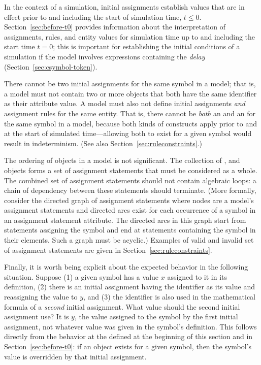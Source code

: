 In the context of a simulation, initial assignments establish
values that are in effect prior to and including the start of
simulation time, \ie $t \leq 0$.  Section~\ref{sec:before-t0}
provides information about the interpretation of assignments,
rules, and entity values for simulation time up to and including
the start time $t = 0$; this is important for establishing the
initial conditions of a simulation if the model involves
expressions containing the \emph{delay} 
(Section~\ref{sec:csymbol-token}).

There cannot be two initial assignments for the same symbol in a
model; that is, a model must not contain two or more
\InitialAssignment objects that both have the same identifier as
their  attribute value.  A model must also not define
initial assignments \emph{and} assignment rules for the same
entity.  That is, there cannot be \emph{both} an
\InitialAssignment and an \AssignmentRule for the same symbol in a
model, because both kinds of constructs apply prior to and at the
start of simulated time---allowing both to exist for a given
symbol would result in indeterminism.  (See also
Section~\ref{sec:ruleconstraints}.)

The ordering of \InitialAssignment objects in a model is not
significant.  The collection of \InitialAssignment,
\AssignmentRule and \KineticLaw objects forms a set of assignment
statements that must be considered as a whole.  The combined set
of assignment statements should not contain algebraic loops: a
chain of dependency between these statements should terminate.
(More formally, consider the directed graph of assignment
statements where nodes are a model's assignment statements and
directed arcs exist for each occurrence of a symbol in an
assignment statement  attribute.  The directed arcs in
this graph start from statements assigning the symbol and end at
statements containing the symbol in their  elements.
Such a graph must be acyclic.) Examples of valid and invalid set
of assignment statements are given in
Section~\ref{sec:ruleconstraints}.

Finally, it is worth being explicit about the expected behavior in
the following situation.  Suppose (1) a given symbol has a value
$x$ assigned to it in its definition, (2) there is an initial
assignment having the identifier as its  value and
reassigning the value to $y$, and (3) the identifier is
also used in the mathematical formula of a \emph{second} initial
assignment.  What value should the second initial assignment use?
It is $y$, the value assigned to the symbol by the first initial
assignment, not whatever value was given in the symbol's
definition.  This follows directly from the behavior at the
defined at the beginning of this section and in
Section~\ref{sec:before-t0}: if an \InitialAssignment object
exists for a given symbol, then the symbol's value is overridden
by that initial assignment.


